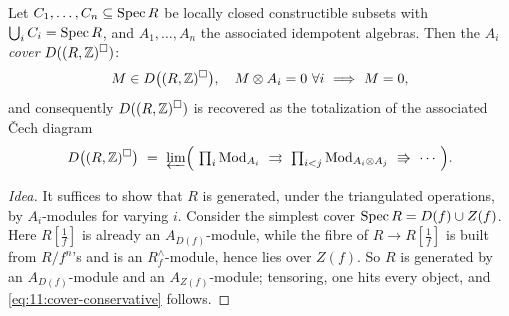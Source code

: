 \begin{proposition}
\label{prop:11:constructible-cover}
Let $C_{1},\dots,C_{n}\subseteq\operatorname{Spec} R$ be locally closed constructible subsets
with $\bigcup_{i}C_{i}=\operatorname{Spec} R$, and $A_{1},\dots,A_{n}$ the associated
idempotent algebras. Then the $A_{i}$ \emph{cover} $D((R,\mathbb{Z})^{\square})$:
\begin{equation}
\label{eq:11:cover-conservative}
M\in D\bigl((R,\mathbb{Z})^{\solid}\bigr),\quad M\otimes A_{i}=0\ \forall i\
\Longrightarrow\ M=0,
\end{equation}
and consequently $D((R,\mathbb{Z})^{\square})$ is recovered as the totalization
of the associated \v{C}ech diagram
\begin{equation*}
D\bigl((R,\mathbb{Z})^{\solid}\bigr)\ =\ \varprojlim\Bigl(\ \textstyle\prod_{i}
\Mod_{A_{i}}\ \rightrightarrows\ \prod_{i<j}\Mod_{A_{i}\otimes A_{j}}\
\Rrightarrow\ \cdots\ \Bigr).
\end{equation*}
\end{proposition}

\begin{proof}[Idea]
It suffices to show that $R$ is generated, under the triangulated operations, by
$A_{i}$-modules for varying $i$. Consider the simplest cover $\operatorname{Spec} R=D(f)\cup
Z(f)$. Here $R[\tfrac1f]$ is already an $A_{D(f)}$-module, while the fibre of
$R\to R[\tfrac1f]$ is built from $R/f^{n}$'s and is an
$R^{\wedge}_{f}$-module, hence lies over $Z(f)$. So $R$ is generated by an
$A_{D(f)}$-module and an $A_{Z(f)}$-module; tensoring, one hits every object,
and \eqref{eq:11:cover-conservative} follows.
\end{proof}

